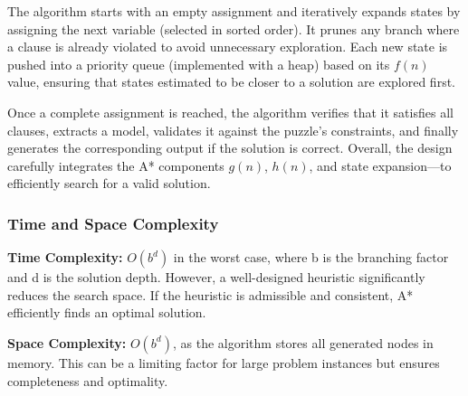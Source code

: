 The algorithm starts with an empty assignment and iteratively expands states by assigning the next variable (selected in sorted order). It prunes any branch where a clause is already violated to avoid unnecessary exploration. Each new state is pushed into a priority queue (implemented with a heap) based on its \( f(n) \) value, ensuring that states estimated to be closer to a solution are explored first.

Once a complete assignment is reached, the algorithm verifies that it satisfies all clauses, extracts a model, validates it against the puzzle's constraints, and finally generates the corresponding output if the solution is correct. Overall, the design carefully integrates the A* components \( g(n) \), \( h(n) \), and state expansion—to efficiently search for a valid solution.

\subsubsection{Time and Space Complexity}
\textbf{Time Complexity:} \( O(b^d) \) in the worst case, where b is the branching factor and d is the solution depth. However, a well-designed heuristic significantly reduces the search space. If the heuristic is admissible and consistent, A* efficiently finds an optimal solution.

\textbf{Space Complexity:} \( O(b^d) \), as the algorithm stores all generated nodes in memory. This can be a limiting factor for large problem instances but ensures completeness and optimality.

